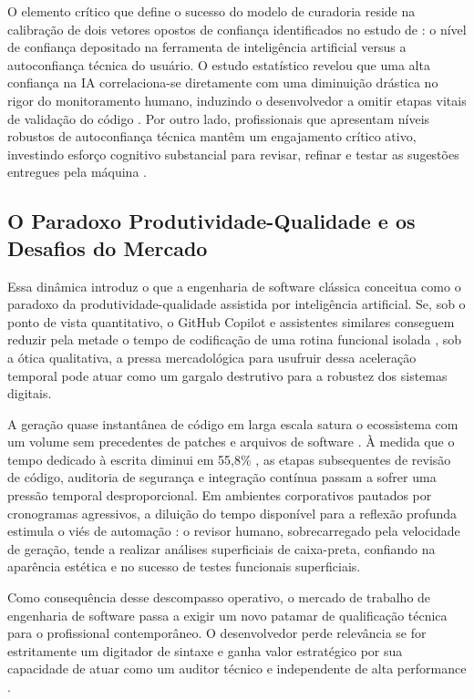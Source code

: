 O elemento crítico que define o sucesso do modelo de curadoria reside na calibração de dois vetores opostos de confiança identificados no estudo de : o nível de confiança depositado na ferramenta de inteligência artificial versus a autoconfiança técnica do usuário. O estudo estatístico revelou que uma alta confiança na IA correlaciona-se diretamente com uma diminuição drástica no rigor do monitoramento humano, induzindo o desenvolvedor a omitir etapas vitais de validação do código \cite{lee2025}. Por outro lado, profissionais que apresentam níveis robustos de autoconfiança técnica mantêm um engajamento crítico ativo, investindo esforço cognitivo substancial para revisar, refinar e testar as sugestões entregues pela máquina \cite{lee2025}.

\subsection{O Paradoxo Produtividade-Qualidade e os Desafios do Mercado}

Essa dinâmica introduz o que a engenharia de software clássica conceitua como o paradoxo da produtividade-qualidade assistida por inteligência artificial. Se, sob o ponto de vista quantitativo, o GitHub Copilot e assistentes similares conseguem reduzir pela metade o tempo de codificação de uma rotina funcional isolada \cite{peng2023}, sob a ótica qualitativa, a pressa mercadológica para usufruir dessa aceleração temporal pode atuar como um gargalo destrutivo para a robustez dos sistemas digitais.

A geração quase instantânea de código em larga escala satura o ecossistema com um volume sem precedentes de patches e arquivos de software \cite{jimenez2024}. À medida que o tempo dedicado à escrita diminui em 55,8\% \cite{peng2023}, as etapas subsequentes de revisão de código, auditoria de segurança e integração contínua passam a sofrer uma pressão temporal desproporcional. Em ambientes corporativos pautados por cronogramas agressivos, a diluição do tempo disponível para a reflexão profunda estimula o viés de automação \cite{mosier1998}: o revisor humano, sobrecarregado pela velocidade de geração, tende a realizar análises superficiais de caixa-preta, confiando na aparência estética e no sucesso de testes funcionais superficiais.

Como consequência desse descompasso operativo, o mercado de trabalho de engenharia de software passa a exigir um novo patamar de qualificação técnica para o profissional contemporâneo. O desenvolvedor perde relevância se for estritamente um digitador de sintaxe  e ganha valor estratégico por sua capacidade de atuar como um auditor técnico e independente de alta performance \cite{lee2025}.

